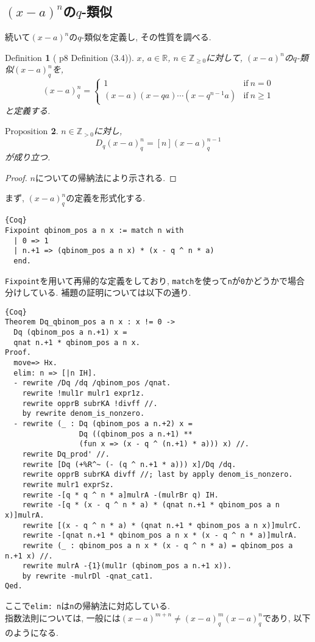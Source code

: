 \documentclass[11pt]{jarticle}
\theoremstyle{mystyle}
\newtheorem{df}{$\textrm{Definition}$}[subsection]
\newtheorem{prop}[df]{$\textrm{Proposition}$}
\newcommand{\bdf}{\begin{shadebox} \begin{df}}
\newcommand{\edf}{\end{df} \end{shadebox}}
\newcommand{\bprop}{\begin{shadebox} \begin{prop}}
\newcommand{\eprop}{\end{prop} \end{shadebox}}
\newcommand{\bpf}{\begin{proof}}
\newcommand{\epf}{\end{proof}}
\newcommand{\Z}{\mathbb{Z}}
\newcommand{\R}{\mathbb{R}}
\newcommand{\0}{\textbf{0}}
\newcommand{\1}{\textbf{1}}
\newcommand{\2}{\textbf{2}}
\begin{document}
\subsection{$(x - a)^n$の$q$-類似}
続いて$(x - a)^n$の$q$-類似を定義し, その性質を調べる.  
\bdf[\cite{Kac} p8 Definition (3.4)]
  $x$, $a \in \R$, $n \in \Z_{\ge 0}$に対して, $(x - a)^n$の$q$-類似$(x - a)^n_q$を, 
  \[
  (x - a)^n_q = \begin{cases}
                      1 & \text{if}\ n = 0 \\
                      (x - a) (x - qa) \cdots (x - q^{n - 1} a) & \text{if}\ n \ge 1
                    \end{cases}
  \]
  と定義する. 
\edf
\bprop \label{Dq_qbinom_nonneg}
  $n\in\Z_{>0}$に対し, 
  \[
    D_q(x-a)^n_q = [n](x-a)^{n-1}_q
  \]
  が成り立つ. 
\eprop
\bpf
  $n$についての帰納法により示される. 
\epf
まず, $(x - a)^n_q$の定義を形式化する. 
\begin{lstlisting}{Coq}
Fixpoint qbinom_pos a n x := match n with
  | 0 => 1
  | n.+1 => (qbinom_pos a n x) * (x - q ^ n * a)
  end. \end{lstlisting}
{\tt Fixpoint}を用いて再帰的な定義をしており, {\tt match}を使って{\tt n}が{\tt 0}かどうかで場合分けしている. 補題の証明については以下の通り. 
\begin{lstlisting}{Coq}
Theorem Dq_qbinom_pos a n x : x != 0 ->
  Dq (qbinom_pos a n.+1) x =
  qnat n.+1 * qbinom_pos a n x.
Proof.
  move=> Hx.
  elim: n => [|n IH].
  - rewrite /Dq /dq /qbinom_pos /qnat.
    rewrite !mul1r mulr1 expr1z.
    rewrite opprB subrKA !divff //.
    by rewrite denom_is_nonzero.
  - rewrite (_ : Dq (qbinom_pos a n.+2) x =
                 Dq ((qbinom_pos a n.+1) **
                 (fun x => (x - q ^ (n.+1) * a))) x) //.
    rewrite Dq_prod' //.
    rewrite [Dq (+%R^~ (- (q ^ n.+1 * a))) x]/Dq /dq.
    rewrite opprB subrKA divff //; last by apply denom_is_nonzero.
    rewrite mulr1 exprSz.
    rewrite -[q * q ^ n * a]mulrA -(mulrBr q) IH.
    rewrite -[q * (x - q ^ n * a) * (qnat n.+1 * qbinom_pos a n x)]mulrA.
    rewrite [(x - q ^ n * a) * (qnat n.+1 * qbinom_pos a n x)]mulrC.
    rewrite -[qnat n.+1 * qbinom_pos a n x * (x - q ^ n * a)]mulrA.
    rewrite (_ : qbinom_pos a n x * (x - q ^ n * a) = qbinom_pos a n.+1 x) //.
    rewrite mulrA -{1}(mul1r (qbinom_pos a n.+1 x)).
    by rewrite -mulrDl -qnat_cat1.
Qed.
\end{lstlisting}
ここで{\tt elim:\,n}は{\tt n}の帰納法に対応している. \\
指数法則については, 一般には$(x - a)^{m + n} \neq (x - a)^m_q(x - a)^n_q$であり, 以下のようになる. 
\end{document}
